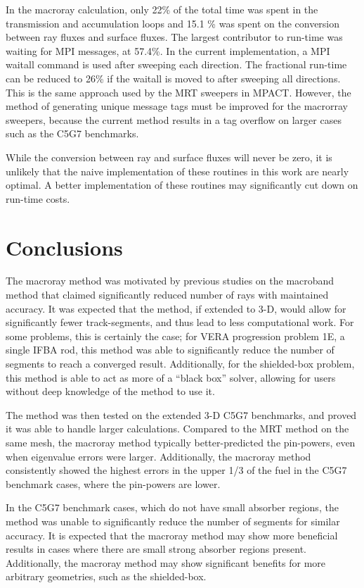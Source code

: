 {{    In the macroray calculation, only 22\% of the total time was spent in the transmission and accumulation loops and 15.1 \% was spent on the conversion between ray fluxes and surface fluxes.
    The largest contributor to run-time was waiting for MPI messages, at 57.4\%.
    In the current implementation, a MPI waitall command is used after sweeping each direction.
    The fractional run-time can be reduced to 26\% if the waitall is moved to after sweeping all directions.
    This is the same approach used by the \ac{MRT} sweepers in MPACT.
    However, the method of generating unique message tags must be improved for the macrorray sweepers, because the current method results in a tag overflow on larger cases such as the C5G7 benchmarks.

    While the conversion between ray and surface fluxes will never be zero, it is unlikely that the naive implementation of these routines in this work are nearly optimal.
    A better implementation of these routines may significantly cut down on run-time costs.
  }


  \section{Conclusions}{\label{sec:MR:Conclusions}
    The macroray method was motivated by previous studies on the macroband method that claimed significantly reduced number of rays with maintained accuracy.
    It was expected that the method, if extended to 3-D, would allow for significantly fewer track-segments, and thus lead to less computational work.
    For some problems, this is certainly the case; for \ac{VERA} progression problem 1E, a single \ac{IFBA} rod, this method was able to significantly reduce the number of segments to reach a converged result.
    Additionally, for the shielded-box problem, this method is able to act as more of a ``black box'' solver, allowing for users without deep knowledge of the method to use it.

    The method was then tested on the extended 3-D C5G7 benchmarks, and proved it was able to handle larger calculations.
    Compared to the \ac{MRT} method on the same mesh, the macroray method typically better-predicted the pin-powers, even when eigenvalue errors were larger.
    Additionally, the macroray method consistently showed the highest errors in the upper 1/3 of the fuel in the C5G7 benchmark cases, where the pin-powers are lower.

    In the C5G7 benchmark cases, which do not have small absorber regions, the method was unable to significantly reduce the number of segments for similar accuracy.
    It is expected that the macroray method may show more beneficial results in cases where there are small strong absorber regions present.
    Additionally, the macroray method may show significant benefits for more arbitrary geometries, such as the shielded-box.

}}
